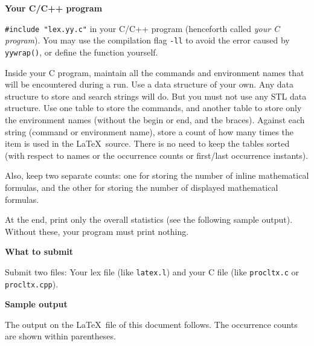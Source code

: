 \documentclass[12pt,fleqn,a4paper]{article}
\def\bs{{\tt\char92}}
\begin{document}
\bigskip
{\bf Your C/C++ program}

{\tt\#include "lex.yy.c"} in your C/C++ program (henceforth called {\it your
C program}). You may use the compilation flag {\tt-ll} to avoid the error caused by
{\tt yywrap()}, or define the function yourself.

Inside your C program, maintain all the commands and environment names that
will be encountered during a run. Use a data structure of your own. Any data
structure to store and search strings will do. But you must not use any
STL data structure. Use one table to store the commands, and another table
to store only the environment names (without the \bs begin or \bs end, and
the braces). Against each string (command or environment name), store
a count of how many times the item is used in the \LaTeX\ source.
There is no need to keep the tables sorted (with respect to names or
the occurrence counts or first/last occurrence instants).

Also, keep two separate counts: one for storing the number of inline
mathematical formulas, and the other for storing the number of displayed
mathematical formulas.

At the end, print only the overall statistics (see the following sample output).
Without these, your program must print nothing.

\bigskip
{\bf What to submit}

Submit two files: Your lex file (like {\tt latex.l}) and your C file (like
{\tt procltx.c} or {\tt procltx.cpp}).

\newpage
{\bf Sample output}

The output on the \LaTeX\ file of this document follows.
The occurrence counts are shown within parentheses.

\begin{quote}
\color{DarkGreen}\footnotesize

\end{quote}

\vspace*{-\medskipamount}
\end{document}
